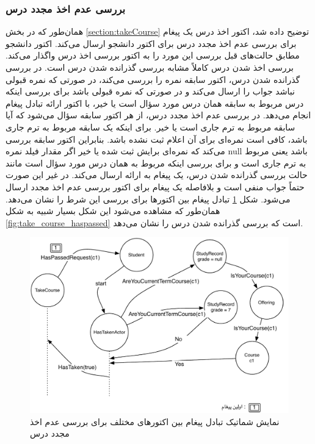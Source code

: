 \FloatBarrier
\subsubsection{بررسی عدم اخذ مجدد درس}
همان‌طور که در بخش \ref{section:takeCourse} توضیح داده شد، اکتور اخذ درس یک پیغام برای بررسی عدم اخذ مجدد درس برای اکتور دانشجو ارسال می‌کند. اکتور دانشجو مطابق حالت‌های قبل بررسی این مورد را به اکتور بررسی اخذ درس واگذار می‌کند. بررسی  اخذ شدن درس کاملاً مشابه بررسی گذرانده شدن درس است. در بررسی گذرانده شدن درس، اکتور سابقه نمره را بررسی می‌کند، در صورتی که نمره قبولی نباشد جواب را ارسال می‌کند و در صورتی که نمره قبولی باشد برای بررسی اینکه درس مربوط به سابقه همان درس مورد سؤال است یا خیر، با اکتور ارائه تبادل پیغام انجام می‌دهد. در بررسی عدم اخذ مجدد درس، از هر اکتور سابقه سؤال می‌شود که آیا سابقه مربوط به ترم جاری است یا خیر. برای اینکه  یک سابقه مربوط به ترم جاری باشد، کافی است نمره‌ای برای آن اعلام ثبت نشده باشد. بنابراین اکتور سابقه بررسی می‌کند که نمره‌ای برایش ثبت شده یا خیر اگر مقدار فیلد نمره null باشد یعنی مربوط به ترم جاری است و برای بررسی اینکه مربوط به همان درس مورد سؤال است مانند حالت بررسی گذرانده شدن درس، یک پیغام به ارائه ارسال می‌کند. در غیر این صورت حتماً جواب منفی است و بلافاصله یک پیغام برای اکتور بررسی عدم اخذ مجدد ارسال می‌شود. شکل  \ref{fig:take_course_taken} تبادل پیغام بین اکتورها برای بررسی این شرط را نشان می‌دهد. همان‌طور که مشاهده می‌شود این شکل بسیار شبیه به شکل \ref{fig:take_course_haspassed} است که بررسی گذرانده شدن درس را نشان می‌دهد.

\begin{figure}
    \begin{center}
	\includegraphics[width=14cm]{4-ProposedFramework/Figures/HasTaken.pdf}
    \end{center}
    \caption{\label{fig:take_course_taken}نمایش شماتیک تبادل پیغام بین اکتورهای مختلف برای بررسی عدم اخذ مجدد درس }
\end{figure}





